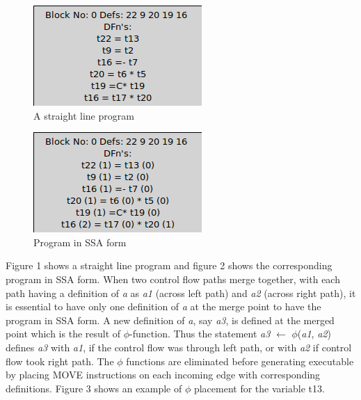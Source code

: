 \documentclass[10pt, oneside, a4paper]{article}
\begin{document}
\begin{figure}[htb]
\begin{center}
\ifpdf
	\includegraphics[scale=0.50]{./straightLineProgram.png}
\else
\fi
\caption{A straight line program}
\label{fig:1}
\end{center}
\end{figure}
\begin{figure}[htb]
\begin{center}
\ifpdf
	\includegraphics[scale=0.50]{./programInSSa.png}
\else
\fi
\caption{Program in SSA form}
\label{fig:2}
\end{center}
\end{figure}

Figure 1 shows a straight line program and figure 2 shows the corresponding program in SSA form.  When two control flow paths merge together, with each path having a definition of \emph{a} as \emph{a1} (across left path) and \emph{a2} (across right path), it is essential to have only one definition of \emph{a} at the merge point to have the program in SSA form.  A new definition of \emph{a}, say \emph{a3}, is defined at the merged point which is the result of $\phi$-function.  Thus the statement \emph{a3} $\leftarrow$ $\phi$(\emph{a1}, \emph{a2}) defines \emph{a3} with \emph{a1}, if the control flow was through left path, or with \emph{a2} if control flow took right path.  The $\phi$ functions are eliminated before generating executable by placing MOVE instructions on each incoming edge with corresponding definitions.  Figure 3 shows an example of $\phi$ placement for the variable t13.
\end{document}

